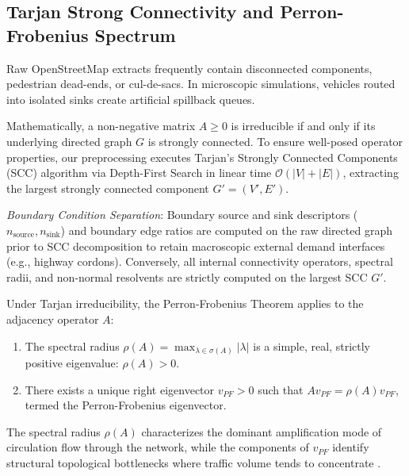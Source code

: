 \documentclass[journal]{IEEEtran}
\begin{document}
\subsection{Tarjan Strong Connectivity and Perron-Frobenius Spectrum}
Raw OpenStreetMap extracts frequently contain disconnected components, pedestrian dead-ends, or cul-de-sacs. In microscopic simulations, vehicles routed into isolated sinks create artificial spillback queues.

Mathematically, a non-negative matrix $A \ge 0$ is irreducible if and only if its underlying directed graph $G$ is strongly connected. To ensure well-posed operator properties, our preprocessing executes Tarjan's Strongly Connected Components (SCC) algorithm \cite{Tarjan1972} via Depth-First Search in linear time $\mathcal{O}(|V| + |E|)$, extracting the largest strongly connected component $G' = (V', E')$.

\textit{Boundary Condition Separation}: Boundary source and sink descriptors ($n_{\text{source}}, n_{\text{sink}}$) and boundary edge ratios are computed on the raw directed graph prior to SCC decomposition to retain macroscopic external demand interfaces (e.g., highway cordons). Conversely, all internal connectivity operators, spectral radii, and non-normal resolvents are strictly computed on the largest SCC $G'$.

Under Tarjan irreducibility, the Perron-Frobenius Theorem \cite{Perron1907, Frobenius1912} applies to the adjacency operator $A$:
\begin{enumerate}
    \item The spectral radius $\rho(A) = \max_{\lambda \in \sigma(A)} |\lambda|$ is a simple, real, strictly positive eigenvalue: $\rho(A) > 0$.
    \item There exists a unique right eigenvector $v_{PF} > 0$ such that $A v_{PF} = \rho(A) v_{PF}$, termed the Perron-Frobenius eigenvector.
\end{enumerate}
The spectral radius $\rho(A)$ characterizes the dominant amplification mode of circulation flow through the network, while the components of $v_{PF}$ identify structural topological bottlenecks where traffic volume tends to concentrate \cite{Cvetkovic1980, Bell2000}.
\end{document}
